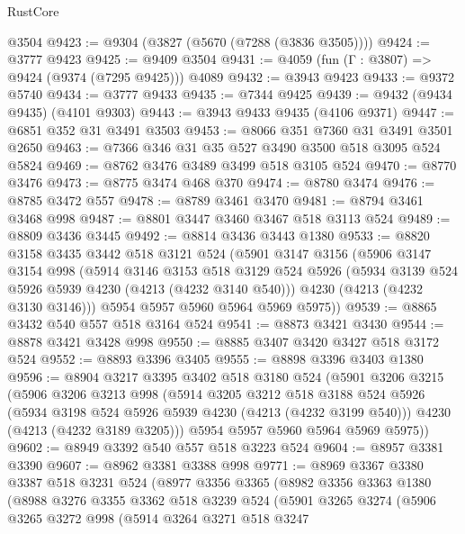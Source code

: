 \begin{lexlean}{RustCore}
\begin{coremodule}
    @3504
@9423 := @9304 (@3827 (@5670 (@7288 (@3836 @3505))))
@9424 := @3777 @9423
@9425 := @9409 @3504
@9431 := @4059 (fun (Γ : @3807) => @9424 (@9374 (@7295 @9425))) @4089
@9432 := @3943 @9423
@9433 := @9372 @5740
@9434 := @3777 @9433
@9435 := @7344 @9425
@9439 := @9432 (@9434 @9435) (@4101 @9303)
@9443 := @3943 @9433 @9435 (@4106 @9371)
@9447 := @6851 @352 @31 @3491 @3503
@9453 := @8066 @351 @7360 @31 @3491 @3501 @2650
@9463 := @7366 @346 @31 @35 @527 @3490 @3500 @518 @3095 @524 @5824
@9469 := @8762 @3476 @3489 @3499 @518 @3105 @524
@9470 := @8770 @3476
@9473 := @8775 @3474 @468 @370
@9474 := @8780 @3474
@9476 := @8785 @3472 @557
@9478 := @8789 @3461 @3470
@9481 := @8794 @3461 @3468 @998
@9487 := @8801 @3447 @3460 @3467 @518 @3113 @524
@9489 := @8809 @3436 @3445
@9492 := @8814 @3436 @3443 @1380
@9533 := @8820
    @3158
    @3435
    @3442
    @518
    @3121
    @524
    (@5901
      @3147
      @3156
      (@5906
        @3147
        @3154
        @998
        (@5914
          @3146
          @3153
          @518
          @3129
          @524
          @5926
          (@5934 @3139 @524 @5926 @5939 @4230 (@4213 (@4232 @3140 @540)))
          @4230
          (@4213 (@4232 @3130 @3146)))
        @5954
        @5957
        @5960
        @5964
        @5969
        @5975))
@9539 := @8865 @3432 @540 @557 @518 @3164 @524
@9541 := @8873 @3421 @3430
@9544 := @8878 @3421 @3428 @998
@9550 := @8885 @3407 @3420 @3427 @518 @3172 @524
@9552 := @8893 @3396 @3405
@9555 := @8898 @3396 @3403 @1380
@9596 := @8904
    @3217
    @3395
    @3402
    @518
    @3180
    @524
    (@5901
      @3206
      @3215
      (@5906
        @3206
        @3213
        @998
        (@5914
          @3205
          @3212
          @518
          @3188
          @524
          @5926
          (@5934 @3198 @524 @5926 @5939 @4230 (@4213 (@4232 @3199 @540)))
          @4230
          (@4213 (@4232 @3189 @3205)))
        @5954
        @5957
        @5960
        @5964
        @5969
        @5975))
@9602 := @8949 @3392 @540 @557 @518 @3223 @524
@9604 := @8957 @3381 @3390
@9607 := @8962 @3381 @3388 @998
@9771 := @8969
    @3367
    @3380
    @3387
    @518
    @3231
    @524
    (@8977
      @3356
      @3365
      (@8982
        @3356
        @3363
        @1380
        (@8988
          @3276
          @3355
          @3362
          @518
          @3239
          @524
          (@5901
            @3265
            @3274
            (@5906
              @3265
              @3272
              @998
              (@5914
                @3264
                @3271
                @518
                @3247

\end{coremodule}
\end{lexlean}
